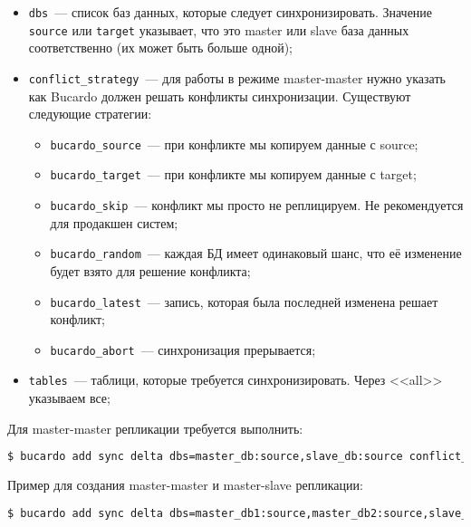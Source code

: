 \begin{itemize}
  \item \lstinline!dbs!~--- список баз данных, которые следует синхронизировать. Значение \lstinline!source! или \lstinline!target! указывает, что это master или slave база данных соответственно (их может быть больше одной);

  \item \lstinline!conflict_strategy!~--- для работы в режиме master-master нужно указать как Bucardo должен решать конфликты синхронизации. Существуют следующие стратегии:

  \begin{itemize}
    \item \lstinline!bucardo_source!~--- при конфликте мы копируем данные с source;
    \item \lstinline!bucardo_target!~--- при конфликте мы копируем данные с target;
    \item \lstinline!bucardo_skip!~--- конфликт мы просто не реплицируем. Не рекомендуется для продакшен систем;
    \item \lstinline!bucardo_random!~--- каждая БД имеет одинаковый шанс, что её изменение будет взято для решение конфликта;
    \item \lstinline!bucardo_latest!~--- запись, которая была последней изменена решает конфликт;
    \item \lstinline!bucardo_abort!~--- синхронизация прерывается;
  \end{itemize}

  \item \lstinline!tables!~--- таблици, которые требуется синхронизировать. Через <<all>> указываем все;
\end{itemize}

Для master-master репликации требуется выполнить:

\begin{lstlisting}[language=Bash,label=lst:bucardo10,caption=Настройка репликации]
$ bucardo add sync delta dbs=master_db:source,slave_db:source conflict_strategy=bucardo_latest tables=all
\end{lstlisting}

Пример для создания master-master и master-slave репликации:

\begin{lstlisting}[language=Bash,label=lst:bucardo-master-slave1,caption=Настройка репликации]
$ bucardo add sync delta dbs=master_db1:source,master_db2:source,slave_db1:target,slave_db2:target conflict_strategy=bucardo_latest tables=all
\end{lstlisting}

